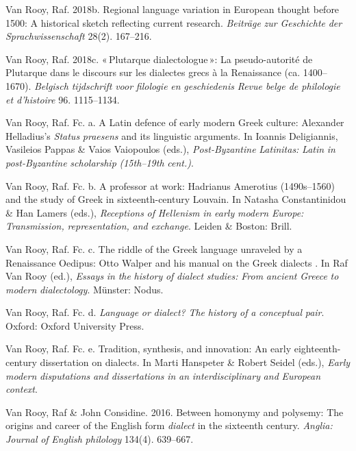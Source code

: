 Van Rooy, Raf. 2018b. Regional language variation in European thought before 1500: A historical sketch reflecting current research. \textit{Beiträge} \textit{zur} \textit{Geschichte} \textit{der} \textit{Sprachwissenschaft} 28(2). 167–216.

Van Rooy, Raf. 2018c. « Plutarque dialectologue »: La pseudo-autorité de Plutarque dans le discours sur les dialectes grecs à la Renaissance (ca. 1400–1670). \textit{Belgisch} \textit{tijdschrift} \textit{voor} \textit{filologie} \textit{en} \textit{geschiedenis} \textit{{\textbar} Revue belge de philologie et d’histoire} 96. 1115–1134.

Van Rooy, Raf. Fc. a. A Latin defence of early modern Greek culture: Alexander Helladius’s \textit{Status} \textit{praesens}  and its linguistic arguments. In Ioannis Deligiannis, Vasileios Pappas \& Vaios Vaiopoulos (eds.), \textit{Post-Byzantine} \textit{Latinitas:} \textit{Latin} \textit{in} \textit{post-Byzantine} \textit{scholarship} \textit{(15th–19th} \textit{cent.)}.

Van Rooy, Raf. Fc. b. A professor at work: Hadrianus Amerotius (1490s–1560) and the study of Greek in sixteenth-century Louvain. In Natasha Constantinidou \& Han Lamers (eds.), \textit{Receptions} \textit{of} \textit{Hellenism} \textit{in} \textit{early} \textit{modern} \textit{Europe:} \textit{Transmission,} \textit{representation,} \textit{and} \textit{exchange}. Leiden \& Boston: Brill.

Van Rooy, Raf. Fc. c. The riddle of the Greek language unraveled by a Renaissance Oedipus: Otto Walper and his manual on the Greek dialects . In Raf Van Rooy (ed.), \textit{Essays} \textit{in} \textit{the} \textit{history} \textit{of} \textit{dialect} \textit{studies:} \textit{From} \textit{ancient} \textit{Greece} \textit{to} \textit{modern} \textit{dialectology}. Münster: Nodus.

Van Rooy, Raf. Fc. d. \textit{Language} \textit{or} \textit{dialect?} \textit{The} \textit{history} \textit{of} \textit{a} \textit{conceptual} \textit{pair}. Oxford: Oxford University Press.

Van Rooy, Raf. Fc. e. Tradition, synthesis, and innovation: An early eighteenth-century dissertation on dialects. In Marti Hanspeter \& Robert Seidel (eds.), \textit{Early} \textit{modern} \textit{disputations} \textit{and} \textit{dissertations} \textit{in} \textit{an} \textit{interdisciplinary} \textit{and} \textit{European} \textit{context}.

Van Rooy, Raf \& John Considine. 2016. Between homonymy and polysemy: The origins and career of the English form \textit{dialect} in the sixteenth century. \textit{Anglia:} \textit{Journal} \textit{of} \textit{English} \textit{philology} 134(4). 639–667.

